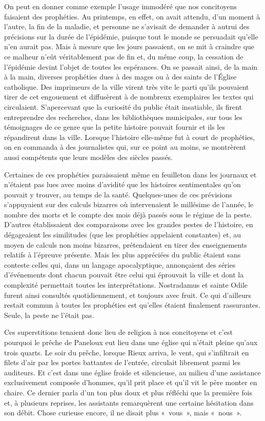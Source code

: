 \documentclass[french,twoside]{book} %
\begin{document}
On peut en donner comme exemple l’usage immodéré que nos concitoyens faisaient des prophéties. Au printemps, en effet, on avait attendu, d’un moment à l’autre, la fin de la maladie, et personne ne s’avisait de demander à autrui des précisions sur la durée de l’épidémie, puisque tout le monde se persuadait qu’elle n’en aurait pas. Mais à mesure que les jours passaient, on se mit à craindre que ce malheur n’eût véritablement pas de fin et, du même coup, la cessation de l’épidémie devint l’objet de toutes les espérances. On se passait ainsi, de la main à la main, diverses prophéties dues à des mages ou à des saints de l’Église catholique. Des imprimeurs de la ville virent très vite le parti qu’ils pouvaient tirer de cet engouement et diffusèrent à de nombreux exemplaires les textes qui circulaient. S’apercevant que la curiosité du public était insatiable, ils firent entreprendre des recherches, dans les bibliothèques municipales, sur tous les témoignages de ce genre que la petite histoire pouvait fournir et ils les répandirent dans la ville. Lorsque l’histoire elle-même fut à court de prophéties, on en commanda à des journalistes qui, sur ce point au moins, se montrèrent aussi compétents que leurs modèles des siècles passés.\par
Certaines de ces prophéties paraissaient même en feuilleton dans les journaux et n’étaient pas lues avec moins d’avidité que les histoires sentimentales qu’on pouvait y trouver, au temps de la santé. Quelques-unes de ces prévisions s’appuyaient sur des calculs bizarres où intervenaient le millésime de l’année, le nombre des morts et le compte des mois déjà passés sous le régime de la peste. D’autres établissaient des comparaisons avec les grandes pestes de l’histoire, en dégageaient les similitudes (que les prophéties appelaient constantes) et, au moyen de calculs non moins bizarres, prétendaient en tirer des enseignements relatifs à l’épreuve présente. Mais les plus appréciées du public étaient sans conteste celles qui, dans un langage apocalyptique, annonçaient des séries d’événements dont chacun pouvait être celui qui éprouvait la ville et dont la complexité permettait toutes les interprétations. Nostradamus et sainte Odile furent ainsi consultés quotidiennement, et toujours avec fruit. Ce qui d’ailleurs restait commun à toutes les prophéties est qu’elles étaient finalement rassurantes. Seule, la peste ne l’était pas.\par
Ces superstitions tenaient donc lieu de religion à nos concitoyens et c’est pourquoi le prêche de Paneloux eut lieu dans une église qui n’était pleine qu’aux trois quarts. Le soir du prêche, lorsque Rieux arriva, le vent, qui s’infiltrait en filets d’air par les portes battantes de l’entrée, circulait librement parmi les auditeurs. Et c’est dans une église froide et silencieuse, au milieu d’une assistance exclusivement composée d’hommes, qu’il prit place et qu’il vit le père monter en chaire. Ce dernier parla d’un ton plus doux et plus réfléchi que la première fois et, à plusieurs reprises, les assistants remarquèrent une certaine hésitation dans son débit. Chose curieuse encore, il ne disait plus « vous », mais « nous ».\par
\end{document}

